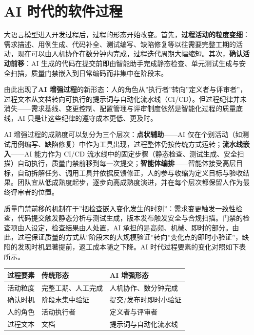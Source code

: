 \documentclass[12pt,a4paper,twoside,openany]{ctexbook}
\numberwithin{figure}{chapter}
\numberwithin{table}{chapter}
\newcounter{none}
\begin{document}
\section{AI
时代的软件过程}\label{ai-ux65f6ux4ee3ux7684ux8f6fux4ef6ux8fc7ux7a0b}

大语言模型进入开发过程后，过程的形态开始改变。首先，\textbf{过程活动的粒度变细}：需求描述、用例生成、代码补全、测试编写、缺陷修复等以往需要完整工期的活动，现在可以由人机协作在数分钟内完成，过程迭代周期大幅缩短。其次，\textbf{确认活动前移}：AI
生成的代码在提交前即由智能助手完成静态检查、单元测试生成与安全扫描，质量门禁嵌入到日常编码而非集中在阶段末。

由此出现了\textbf{AI
增强过程}的新形态：人的角色从''执行者''转向''定义者与评审者''，过程文本从文档转向可执行的提示词与自动化流水线（CI/CD）。但过程纪律并未消失------需求基线、变更控制、配置管理与评审制度依然是智能化过程的质量底线，AI
只是让这些纪律的遵守成本更低、更及时。

AI 增强过程的成熟度可以划分为三个层次：\textbf{点状辅助}------AI
仅在个别活动（如测试用例编写、缺陷修复）中作为工具出现，过程整体仍按传统方式运转；\textbf{流水线嵌入}------AI
能力作为 CI/CD
流水线中的固定步骤（静态检查、测试生成、安全扫描）自动执行，质量门禁前移到每一次提交；\textbf{智能体编排}------智能体接受高层目标，自动拆解任务、调用工具并依据反馈修正，人的参与收缩为定义目标与验收结果。团队宜从低成熟度起步，逐步向高成熟度演进，并在每个层次都保留人作为最终评审者的位置。

质量门禁前移的机制在于''把检查嵌入变化发生的时刻''：需求变更触发一致性检查，代码提交触发静态分析与测试生成，版本发布触发安全与合规扫描。门禁的检查项由人设定，检查结果由人处置，AI
承担的是高频、机械、即时的部分。由此，过程保证质量的方式从''阶段末的大规模验证''转向''变化点的即时小验证''，缺陷的发现时机显著提前，返工成本随之下降。AI
时代过程要素的变化对照如下表所示。

{\def\LTcaptype{none} %
\begin{longtable}[]{@{}lll@{}}
\toprule\noalign{}
过程要素 & 传统形态 & AI 增强形态 \\
\midrule\noalign{}
\endhead
\bottomrule\noalign{}
\endlastfoot
活动粒度 & 完整工期、人工完成 & 人机协作、数分钟完成 \\
确认时机 & 阶段末集中验证 & 提交/发布时即时小验证 \\
人的角色 & 活动执行者 & 定义者与评审者 \\
过程文本 & 文档 & 提示词与自动化流水线 \\
\end{longtable}
}
\end{document}
